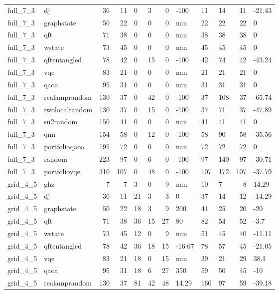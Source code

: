 \begin{longtable}{llrrllrlllrl}
full\_7\_3 & dj & 36 & 11 & 0 & 3 & 0 & -100 & 11 & 14 & 11 & -21.43 \\
full\_7\_3 & graphstate & 50 & 22 & 0 & 0 & 0 & nan & 22 & 22 & 22 & 0 \\
full\_7\_3 & qft & 71 & 38 & 0 & 0 & 0 & nan & 38 & 38 & 38 & 0 \\
full\_7\_3 & wstate & 73 & 45 & 0 & 0 & 0 & nan & 45 & 45 & 45 & 0 \\
full\_7\_3 & qftentangled & 78 & 42 & 0 & 15 & 0 & -100 & 42 & 74 & 42 & -43.24 \\
full\_7\_3 & vqe & 83 & 21 & 0 & 0 & 0 & nan & 21 & 21 & 21 & 0 \\
full\_7\_3 & qaoa & 95 & 31 & 0 & 0 & 0 & nan & 31 & 31 & 31 & 0 \\
full\_7\_3 & realamprandom & 130 & 37 & 0 & 42 & 0 & -100 & 37 & 108 & 37 & -65.74 \\
full\_7\_3 & twolocalrandom & 130 & 37 & 0 & 15 & 0 & -100 & 37 & 71 & 37 & -47.89 \\
full\_7\_3 & su2random & 150 & 41 & 0 & 0 & 0 & nan & 41 & 41 & 41 & 0 \\
full\_7\_3 & qnn & 154 & 58 & 0 & 12 & 0 & -100 & 58 & 90 & 58 & -35.56 \\
full\_7\_3 & portfolioqaoa & 195 & 72 & 0 & 0 & 0 & nan & 72 & 72 & 72 & 0 \\
full\_7\_3 & random & 223 & 97 & 0 & 6 & 0 & -100 & 97 & 140 & 97 & -30.71 \\
full\_7\_3 & portfoliovqe & 310 & 107 & 0 & 48 & 0 & -100 & 107 & 172 & 107 & -37.79 \\
grid\_4\_5 & ghz & 7 & 7 & 3 & 0 & 9 & nan & 10 & 7 & 8 & 14.29 \\
grid\_4\_5 & dj & 36 & 11 & 21 & 3 & 3 & 0 & 37 & 14 & 12 & -14.29 \\
grid\_4\_5 & graphstate & 50 & 22 & 18 & 3 & 9 & 200 & 41 & 25 & 20 & -20 \\
grid\_4\_5 & qft & 71 & 38 & 36 & 15 & 27 & 80 & 82 & 54 & 52 & -3.7 \\
grid\_4\_5 & wstate & 73 & 45 & 12 & 0 & 9 & nan & 51 & 45 & 40 & -11.11 \\
grid\_4\_5 & qftentangled & 78 & 42 & 36 & 18 & 15 & -16.67 & 78 & 57 & 45 & -21.05 \\
grid\_4\_5 & vqe & 83 & 21 & 18 & 0 & 15 & nan & 39 & 21 & 29 & 38.1 \\
grid\_4\_5 & qaoa & 95 & 31 & 18 & 6 & 27 & 350 & 59 & 50 & 45 & -10 \\
grid\_4\_5 & realamprandom & 130 & 37 & 81 & 42 & 48 & 14.29 & 160 & 97 & 59 & -39.18 \\

\end{longtable}
